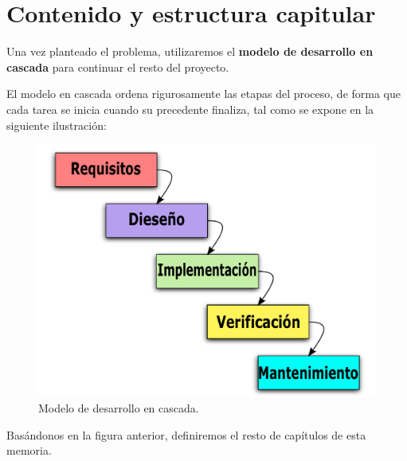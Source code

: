 \newpage

\section{Contenido y estructura capitular}

Una vez planteado el problema, utilizaremos el \textbf{modelo de desarrollo en cascada} para continuar el resto del proyecto.

El modelo en cascada ordena rigurosamente las etapas del proceso, de forma que cada tarea se inicia cuando su precedente finaliza, tal como se expone en la siguiente ilustración:

\smallskip

\begin{figure}[H]
	\noindent \begin{centering}
		\includegraphics[width=\linewidth/2]{capitulo1/cascada}
		\par\end{centering}
	\smallskip
	\caption[Modelo de desarrollo en cascada.]{\label{fig:cascada} Modelo de desarrollo en cascada. \cite{wiki_cascada}}
\end{figure} 

\smallskip

Basándonos en la figura anterior, definiremos el resto de capítulos de esta memoria.


